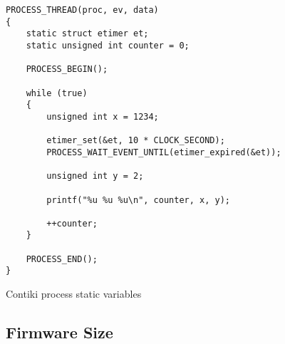 \begin{listing}[H]
\begin{verbatim}
PROCESS_THREAD(proc, ev, data)
{
	static struct etimer et;
	static unsigned int counter = 0;

	PROCESS_BEGIN();

	while (true)
	{
		unsigned int x = 1234;

		etimer_set(&et, 10 * CLOCK_SECOND);
		PROCESS_WAIT_EVENT_UNTIL(etimer_expired(&et));

		unsigned int y = 2;

		printf("%u %u %u\n", counter, x, y);

		++counter;
	}

	PROCESS_END();
}
\end{verbatim}
\caption{Contiki process static variables}
\label{lst:contiki-process-static-variables}
\end{listing}

\subsection{Firmware Size}






